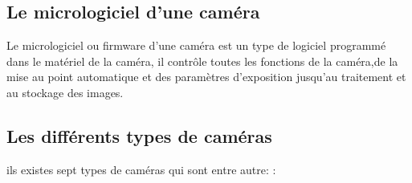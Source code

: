 \subsection{Le micrologiciel d'une caméra}
Le micrologiciel ou firmware d'une caméra est un type de logiciel programmé dans le matériel de la caméra, il contrôle toutes les fonctions de la caméra,de la mise au point automatique et des paramètres d’exposition jusqu’au traitement et au stockage des images.\\

\subsection{Les différents types de caméras}

ils existes sept types de caméras qui sont entre autre: \cite{noauthor_les_2015} :

